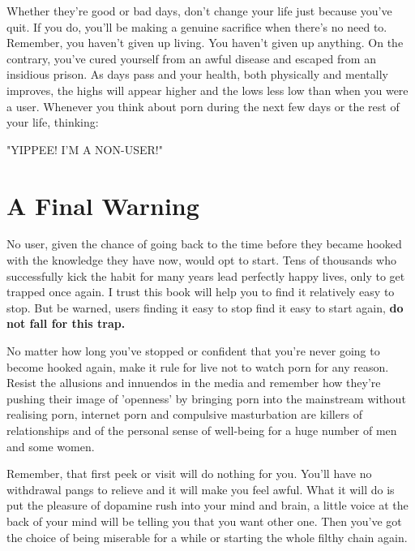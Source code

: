 \documentclass[easypeasy.tex]{subfiles}
\begin{document}
Whether they're good or bad days, don't change your life just because you've quit. If you do, you'll be making a genuine sacrifice when there's no need to. Remember, you haven't given up living. You haven't given up anything. On the contrary, you've cured yourself from an awful disease and escaped from an insidious prison. As days pass and your health, both physically and mentally improves, the highs will appear higher and the lows less low than when you were a user. Whenever you think about porn during the next few days or the rest of your life, thinking:

{\Large "YIPPEE! I'M A NON-USER!"}

\section{A Final Warning}

No user, given the chance of going back to the time before they became hooked with the knowledge they have now, would opt to start. Tens of thousands who successfully kick the habit for many years lead perfectly happy lives, only to get trapped once again. I trust this book will help you to find it relatively easy to stop. But be warned, users finding it easy to stop find it easy to start again, \textbf{do not fall for this trap.}

No matter how long you've stopped or confident that you're never going to become hooked again, make it rule for live not to watch porn for any reason. Resist the allusions and innuendos in the media and remember how they're pushing their image of 'openness' by bringing porn into the mainstream without realising porn, internet porn and compulsive masturbation are killers of relationships and of the personal sense of well-being for a huge number of men and some women.

Remember, that first peek or visit will do nothing for you. You'll have no withdrawal pangs to relieve and it will make you feel awful. What it will do is put the pleasure of dopamine rush into your mind and brain, a little voice at the back of your mind will be telling you that you want other one. Then you've got the choice of being miserable for a while or starting the whole filthy chain again.
\end{document}
